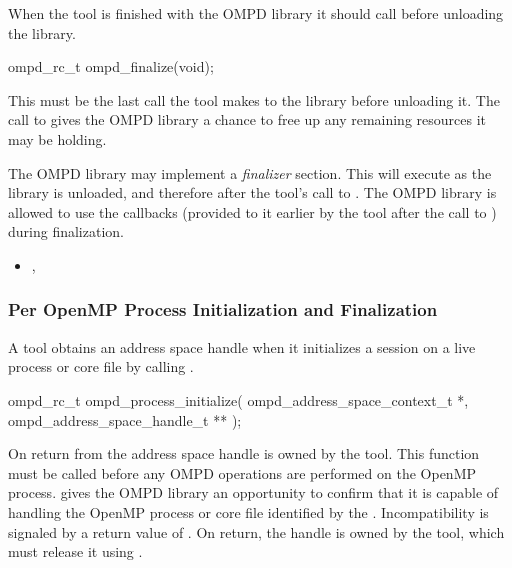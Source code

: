 \label{subsubsubsec:ompd_finalize}

\summary
When the tool is finished with the OMPD library it should call  before 
unloading the library.

\format

\begin{cspecific}
\begin{ompSyntax}
ompd_rc_t ompd_finalize(void);
\end{ompSyntax}
\end{cspecific}


\descr
This must be the last call the tool makes to the library before
unloading it. The call to  gives the OMPD library a chance to
free up any remaining resources it may be holding.

The OMPD library may implement a \emph{finalizer} section. This will execute as the library is 
unloaded, and therefore after the tool's call to . The OMPD library is allowed 
to use the callbacks (provided to it earlier by the tool after the call to 
) during finalization.

\crossreferences
\begin{itemize}
	\item
	, 
\end{itemize}

\subsubsection{Per OpenMP Process Initialization and Finalization}

\label{subsubsubsec:ompd_process_initialize}
\summary
A tool obtains an address space handle when it initializes
a session on a live process or core file by calling .

\format

\begin{cspecific}
\begin{ompSyntax}
ompd_rc_t ompd_process_initialize(
  ompd_address_space_context_t *,
  ompd_address_space_handle_t **
);
\end{ompSyntax}
\end{cspecific}


\descr
On return from  the address
space handle is owned by the tool. This function must be called before any OMPD operations 
are performed on the OpenMP process.  gives the OMPD library an 
opportunity to confirm that it is capable of handling the OpenMP process or core file identified by 
the . Incompatibility is signaled by a return value of . 
On return, the handle is owned by the tool, which must release it using 
.

